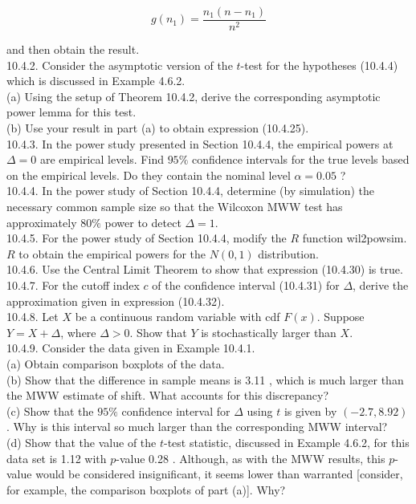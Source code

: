 $$
g\left(n_{1}\right)=\frac{n_{1}\left(n-n_{1}\right)}{n^{2}}
$$

and then obtain the result.\\
10.4.2. Consider the asymptotic version of the $t$-test for the hypotheses (10.4.4) which is discussed in Example 4.6.2.\\
(a) Using the setup of Theorem 10.4.2, derive the corresponding asymptotic power lemma for this test.\\
(b) Use your result in part (a) to obtain expression (10.4.25).\\
10.4.3. In the power study presented in Section 10.4.4, the empirical powers at $\Delta=0$ are empirical levels. Find $95 \%$ confidence intervals for the true levels based on the empirical levels. Do they contain the nominal level $\alpha=0.05$ ?\\
10.4.4. In the power study of Section 10.4.4, determine (by simulation) the necessary common sample size so that the Wilcoxon MWW test has approximately $80 \%$ power to detect $\Delta=1$.\\
10.4.5. For the power study of Section 10.4.4, modify the $R$ function wil2powsim. $R$ to obtain the empirical powers for the $N(0,1)$ distribution.\\
10.4.6. Use the Central Limit Theorem to show that expression (10.4.30) is true.\\
10.4.7. For the cutoff index $c$ of the confidence interval (10.4.31) for $\Delta$, derive the approximation given in expression (10.4.32).\\
10.4.8. Let $X$ be a continuous random variable with cdf $F(x)$. Suppose $Y=X+\Delta$, where $\Delta>0$. Show that $Y$ is stochastically larger than $X$.\\
10.4.9. Consider the data given in Example 10.4.1.\\
(a) Obtain comparison boxplots of the data.\\
(b) Show that the difference in sample means is 3.11 , which is much larger than the MWW estimate of shift. What accounts for this discrepancy?\\
(c) Show that the $95 \%$ confidence interval for $\Delta$ using $t$ is given by $(-2.7,8.92)$. Why is this interval so much larger than the corresponding MWW interval?\\
(d) Show that the value of the $t$-test statistic, discussed in Example 4.6.2, for this data set is 1.12 with $p$-value 0.28 . Although, as with the MWW results, this $p$-value would be considered insignificant, it seems lower than warranted [consider, for example, the comparison boxplots of part (a)]. Why?

